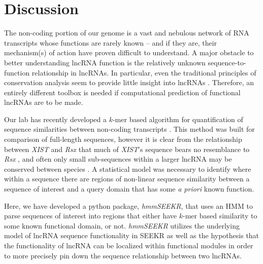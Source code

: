 

\section{Discussion}
The non-coding portion of our genome is a vast and nebulous network of RNA transcripts whose functions are rarely known -- and if they are, their mechanism(s) of action have proven difficult to understand. A major obstacle to better understanding lncRNA function is the relatively unknown sequence-to-function relationship in lncRNAs. In particular, even the traditional principles of conservation analysis seem to provide little insight into lncRNAs \cite{Johnsson2014EvolutionaryFunction,Pang2006RapidFunction,Nesterova2001CharacterizationSequence}. Therefore, an entirely different toolbox is needed if computational prediction of functional lncRNAs are to be made.

Our lab has recently developed a $k$-mer based algorithm for quantification of sequence similarities between non-coding transcripts \cite{Kirk2018FunctionalContent}. This method was built for comparison of full-length sequences, however it is clear from the relationship between \emph{XIST} and \emph{Rsx} that much of \emph{XIST}'s sequence bears no resemblance to \emph{Rsx} \cite{Sprague2019NonlinearDomains}, and often only small sub-sequences within a larger lncRNA may be conserved between species \cite{Pang2006RapidFunction,Nesterova2001CharacterizationSequence}. A statistical model was necessary to identify where within a sequence there are regions of non-linear sequence similarity between a sequence of interest and a query domain that has some \emph{a priori} known function.

Here, we have developed a python package, \emph{hmmSEEKR}, that uses an HMM to parse sequences of interest into regions that either have $k$-mer based similarity to some known functional domain, or not. \emph{hmmSEEKR} utilizes the underlying model of lncRNA sequence functionality in SEEKR \cite{Kirk2018FunctionalContent} as well as the hypothesis that the functionality of lncRNA can be localized within functional modules \cite{Pang2006RapidFunction, Nesterova2001CharacterizationSequence,Hezroni2015PrinciplesSpecies,Brockdorff2018LocalNcRNA,Sprague2019NonlinearDomains} in order to more precisely pin down the sequence relationship between two lncRNAs. 

